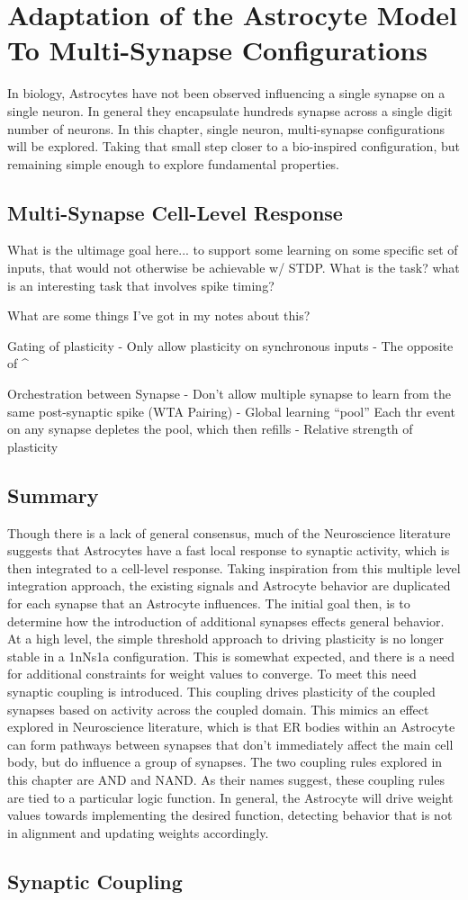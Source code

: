 \chapter{Adaptation of the Astrocyte Model To Multi-Synapse
  Configurations} \label{chapter:obj3}

In biology, Astrocytes have not been observed influencing a single synapse on a
single neuron. In general they encapsulate hundreds synapse across a single
digit number of neurons. In this chapter, single neuron, multi-synapse
configurations will be explored. Taking that small step closer to a bio-inspired
configuration, but remaining simple enough to explore fundamental properties.

\section{Multi-Synapse Cell-Level Response}
What is the ultimage goal here... to support some learning on some specific set
of inputs, that would not otherwise be achievable w/ STDP. What is the task?
what is an interesting task that involves spike timing?

What are some things I've got in my notes about this?

Gating of plasticity
  - Only allow plasticity on synchronous inputs
  - The opposite of ^
  
Orchestration between Synapse
  - Don't allow multiple synapse to learn from the same post-synaptic spike (WTA
  Pairing)
  - Global learning ``pool'' Each thr event on any synapse depletes the pool,
  which then refills
  - Relative strength of plasticity


\section{Summary}
Though there is a lack of general consensus, much of the Neuroscience literature
suggests that Astrocytes have a fast local response to synaptic activity, which
is then integrated to a cell-level response. Taking inspiration from this
multiple level integration approach, the existing signals and Astrocyte behavior
are duplicated for each synapse that an Astrocyte influences. The initial goal
then, is to determine how the introduction of additional synapses effects
general behavior. At a high level, the simple \ca threshold approach to driving
plasticity is no longer stable in a 1nNs1a configuration. This is somewhat
expected, and there is a need for additional constraints for weight values to
converge. To meet this need synaptic coupling is introduced. This coupling
drives plasticity of the coupled synapses based on activity across the coupled
domain. This mimics an effect explored in Neuroscience literature, which is that
ER bodies within an Astrocyte can form pathways between synapses that don't
immediately affect the main cell body, but do influence a group of synapses. The
two coupling rules explored in this chapter are AND and NAND. As their
names suggest, these coupling rules are tied to a particular logic function. In
general, the Astrocyte will drive weight values towards implementing the desired
function, detecting behavior that is not in alignment and updating weights
accordingly.

\section{Synaptic Coupling}
